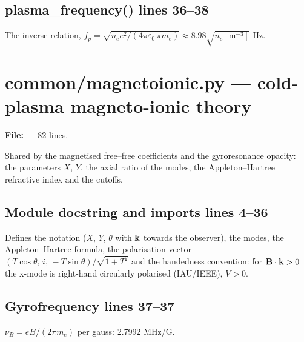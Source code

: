 \section*{\normalsize plasma\_frequency() \hfill{\small\mdseries\color{gray}lines 36--38}}

\begin{lines}
\item[L.38] The inverse relation, $f_p=\sqrt{n_e e^2/(4\pi\varepsilon_0\,\pi m_e)}\approx 8.98\sqrt{n_e[\text{m}^{-3}]}$ Hz.
\end{lines}

\chapter{common/magnetoionic.py --- cold-plasma magneto-ionic theory}
\label{mod:common:magnetoionic.py}
\textbf{File:}  --- 82 lines.

Shared by the magnetised free--free coefficients and the gyroresonance opacity: the
parameters $X$, $Y$, the axial ratio of the modes, the Appleton--Hartree refractive
index and the cutoffs.

\section*{\normalsize Module docstring and imports \hfill{\small\mdseries\color{gray}lines 4--36}}

Defines the notation ($X$, $Y$, $\theta$ with $\mathbf{k}$ towards the observer), the modes, the Appleton--Hartree formula, the polarisation vector $(T\cos\theta,\,i,\,-T\sin\theta)/\sqrt{1+T^2}$ and the handedness convention: for $\mathbf{B}\cdot\mathbf{k}>0$ the x-mode is right-hand circularly polarised (IAU/IEEE), $V>0$.

\section*{\normalsize Gyrofrequency \hfill{\small\mdseries\color{gray}lines 37--37}}

\begin{lines}
\item[L.37] $\nu_B=eB/(2\pi m_e)$ per gauss: 2.7992 MHz/G.
\end{lines}
